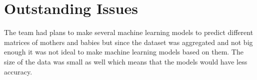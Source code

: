 \section{Outstanding Issues}
The team had plans to make several machine learning models to predict different matrices of mothers and babies but since the dataset was aggregated and not big enough it was not ideal to make machine learning models based on them. The size of the data was small as well which means that the models would have less accuracy.